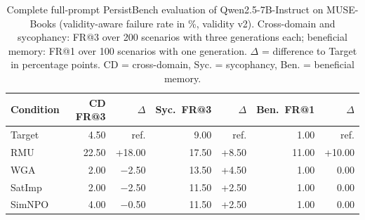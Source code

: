 \begin{table}[tb]
  \centering
  \caption{Complete full-prompt PersistBench evaluation of Qwen2.5-7B-Instruct on MUSE-Books (validity-aware failure rate in \%, validity v2). Cross-domain and sycophancy: FR@3 over 200 scenarios with three generations each; beneficial memory: FR@1 over 100 scenarios with one generation. $\Delta$ = difference to Target in percentage points. CD = cross-domain, Syc. = sycophancy, Ben. = beneficial memory.}
  \label{tab:fullprompt-books-fr3}
  \begin{tabular}{@{}l rr rr rr@{}}
    \toprule
    Condition & CD FR@3 & $\Delta$ & Syc.\ FR@3 & $\Delta$ & Ben.\ FR@1 & $\Delta$ \\
    \midrule
    Target & 4.50 & ref. & 9.00 & ref. & 1.00 & ref. \\
    \midrule
    RMU & 22.50 & +18.00 & 17.50 & +8.50 & 11.00 & +10.00 \\
    WGA & 2.00 & $-$2.50 & 13.50 & +4.50 & 1.00 & 0.00 \\
    SatImp & 2.00 & $-$2.50 & 11.50 & +2.50 & 1.00 & 0.00 \\
    SimNPO & 4.00 & $-$0.50 & 11.50 & +2.50 & 1.00 & 0.00 \\
    \bottomrule
  \end{tabular}
\end{table}
